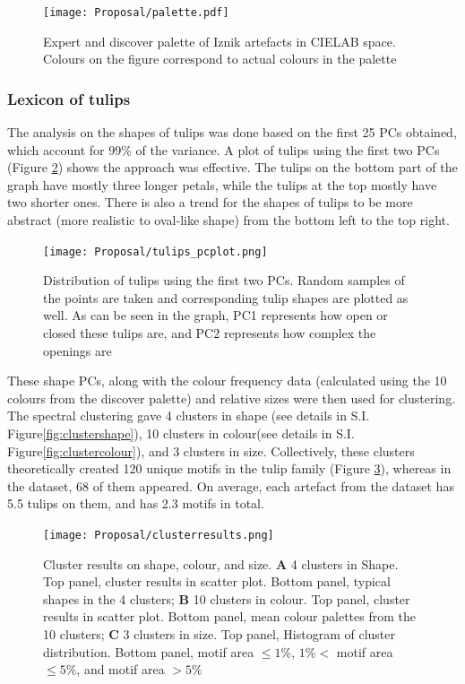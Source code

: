 \documentclass[11pt]{article}
\begin{document}
\begin{figure}[H]
\centering
\texttt{[image: Proposal/palette.pdf]}
\caption{Expert and discover palette of Iznik artefacts in CIELAB space. Colours on the figure correspond to actual colours in the palette}
\label{fig: palette}
\end{figure}

\subsubsection{Lexicon of tulips}
The analysis on the shapes of tulips was done based on the first 25 PCs obtained, which account for 99\% of the variance. A plot of tulips using the first two PCs (Figure \ref{fig:tulippc}) shows the approach was effective. The tulips on the bottom part of the graph have mostly three longer petals, while the tulips at the top mostly have two shorter ones. There is also a trend for the shapes of tulips to be more abstract (more realistic to oval-like shape) from the bottom left to the top right.\par
\begin{figure}[H]
\centering
\texttt{[image: Proposal/tulips\_pcplot.png]}
\caption{Distribution of tulips using the first two PCs. Random samples of the points are taken and corresponding tulip shapes are plotted as well. As can be seen in the graph, PC1 represents how open or closed these tulips are, and PC2 represents how complex the openings are}
\label{fig:tulippc}
\end{figure}
These shape PCs, along with the colour frequency data (calculated using the 10 colours from the discover palette) and relative sizes were then used for clustering. The spectral clustering gave 4 clusters in shape (see details in S.I. Figure\ref{fig:clustershape}), 10 clusters in colour(see details in S.I. Figure\ref{fig:clustercolour}), and 3 clusters in size. Collectively, these clusters theoretically created 120 unique motifs in the tulip family (Figure \ref{fig:clusterresults}), whereas in the dataset, 68 of them appeared. On average, each artefact from the dataset has 5.5 tulips on them, and has 2.3 motifs in total.\par
\begin{figure}[H]
\centering
\texttt{[image: Proposal/clusterresults.png]}
\caption{Cluster results on shape, colour, and size. \textbf{A} 4 clusters in Shape. Top panel, cluster results in scatter plot. Bottom panel, typical shapes in the 4 clusters; \textbf{B} 10 clusters in colour. Top panel, cluster results in scatter plot. Bottom panel, mean colour palettes from the 10 clusters; \textbf{C} 3 clusters in size. Top panel, Histogram of cluster distribution. Bottom panel, motif area $\leq 1\%$,  $1\% <$ motif area $\leq 5\%$, and motif area $> 5\%$ }
\label{fig:clusterresults}
\end{figure}
\end{document}
